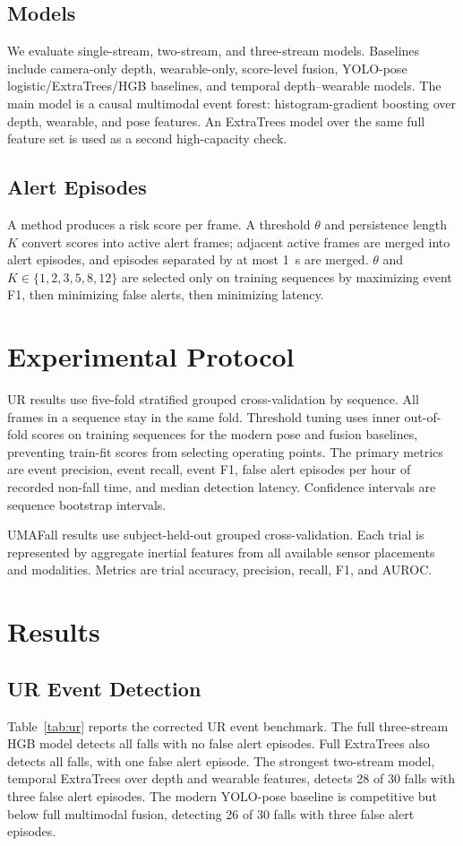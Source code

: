 \documentclass[journal]{IEEEtran}
\begin{document}
\subsection{Models}
We evaluate single-stream, two-stream, and three-stream models. Baselines include camera-only depth, wearable-only, score-level fusion, YOLO-pose logistic/ExtraTrees/HGB baselines, and temporal depth--wearable models. The main model is a causal multimodal event forest: histogram-gradient boosting over depth, wearable, and pose features. An ExtraTrees model over the same full feature set is used as a second high-capacity check.

\subsection{Alert Episodes}
A method produces a risk score per frame. A threshold $\theta$ and persistence length $K$ convert scores into active alert frames; adjacent active frames are merged into alert episodes, and episodes separated by at most \SI{1}{s} are merged. $\theta$ and $K\in\{1,2,3,5,8,12\}$ are selected only on training sequences by maximizing event F1, then minimizing false alerts, then minimizing latency.

\section{Experimental Protocol}
UR results use five-fold stratified grouped cross-validation by sequence. All frames in a sequence stay in the same fold. Threshold tuning uses inner out-of-fold scores on training sequences for the modern pose and fusion baselines, preventing train-fit scores from selecting operating points. The primary metrics are event precision, event recall, event F1, false alert episodes per hour of recorded non-fall time, and median detection latency. Confidence intervals are sequence bootstrap intervals.

UMAFall results use subject-held-out grouped cross-validation. Each trial is represented by aggregate inertial features from all available sensor placements and modalities. Metrics are trial accuracy, precision, recall, F1, and AUROC.

\section{Results}
\subsection{UR Event Detection}
Table~\ref{tab:ur} reports the corrected UR event benchmark. The full three-stream HGB model detects all falls with no false alert episodes. Full ExtraTrees also detects all falls, with one false alert episode. The strongest two-stream model, temporal ExtraTrees over depth and wearable features, detects 28 of 30 falls with three false alert episodes. The modern YOLO-pose baseline is competitive but below full multimodal fusion, detecting 26 of 30 falls with three false alert episodes.
\end{document}
